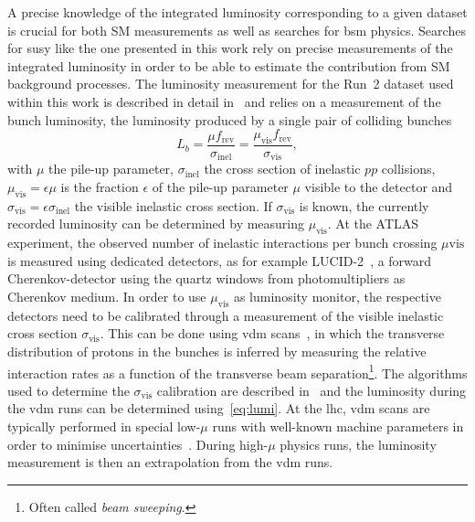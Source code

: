 A precise knowledge of the integrated luminosity corresponding to a given dataset is crucial for both SM measurements as well as searches for \gls{bsm} physics. Searches for \gls{susy} like the one presented in this work rely on precise measurements of the integrated luminosity in order to be able to estimate the contribution from SM background processes. The luminosity measurement for the Run~2 dataset used within this work is described in detail in~\cite{ATLAS-CONF-2019-021,Aaboud:2016hhf} and relies on a measurement of the bunch luminosity, \ie the luminosity produced by a single pair of colliding bunches
\begin{equation}
	L_b = \frac{\mu f_\mathrm{rev}}{	\sigma_\mathrm{inel}} = \frac{\mu_\mathrm{vis}f_\mathrm{rev}}{\sigma_\mathrm{vis}},
\end{equation}
with $\mu$ the pile-up parameter, $\sigma_\mathrm{inel}$ the cross section of inelastic $pp$ collisions, $\mu_\mathrm{vis} = \epsilon \mu$ is the fraction $\epsilon$ of the pile-up parameter $\mu$ visible to the detector and $\sigma_\mathrm{vis} = \epsilon\sigma_\mathrm{inel}$ the visible inelastic cross section. If $\sigma_\mathrm{vis}$ is known, the currently recorded luminosity can be determined by measuring $\mu_\mathrm{vis}$. At the ATLAS experiment, the observed number of inelastic interactions per bunch crossing $\mu\mathrm{vis}$ is measured using dedicated detectors, as for example LUCID-2~\cite{Avoni_2018}, a forward Cherenkov-detector using the quartz windows from photomultipliers as Cherenkov medium.
In order to use $\mu_\mathrm{vis}$ as luminosity monitor, the respective detectors need to be calibrated through a measurement of the visible inelastic cross section $\sigma_\mathrm{vis}$. This can be done using \gls{vdm} scans~\cite{vanderMeer:296752,GRAFSTROM201597}, in which the transverse distribution of protons in the bunches is inferred by measuring the relative interaction rates as a function of the transverse beam separation\footnote{Often called \textit{beam sweeping}.}. The algorithms used to determine the $\sigma_\mathrm{vis}$ calibration are described in~\cite{ATLAS-CONF-2019-021,Aaboud:2016hhf} and the luminosity during the \gls{vdm} runs can be determined using~\cref{eq:lumi}. At the \gls{lhc}, \gls{vdm} scans are typically performed in special low-$\mu$ runs with well-known machine parameters in order to minimise uncertainties~\cite{ATLAS-CONF-2019-021}. During high-$\mu$ physics runs, the luminosity measurement is then an extrapolation from the \gls{vdm} runs.

